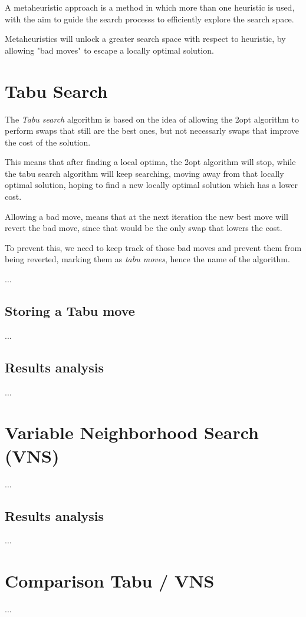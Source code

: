 A metaheuristic approach is a method in which more than one heuristic is used, with the aim to guide the search processs to efficiently explore the search space.

Metaheuristics will unlock a greater search space with respect to heuristic, by allowing "bad moves" to escape a locally optimal solution.

\section{Tabu Search}
The \textit{Tabu search} algorithm is based on the idea of allowing the 2opt algorithm to perform swaps that still are the best ones, but not necessarly swaps that improve the cost of the solution.

This means that after finding a local optima, the 2opt algorithm will stop, while the tabu search algorithm will keep searching, moving away from that locally optimal solution, hoping to find a new locally optimal solution which has a lower cost.

Allowing a bad move, means that at the next iteration the new best move will revert the bad move, since that would be the only swap that lowers the cost.

To prevent this, we need to keep track of those bad moves and prevent them from being reverted, marking them as \textit{tabu moves}, hence the name of the algorithm.

...
\subsection{Storing a Tabu move}
...
\subsection{Results analysis}
...
\section{Variable Neighborhood Search (VNS)}
...
\subsection{Results analysis}
...
\section{Comparison Tabu / VNS}
...